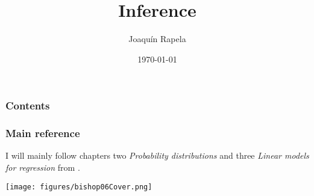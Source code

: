 \documentclass{beamer}
\title{Inference}
\author{Joaqu\'{i}n Rapela} %
\institute[GCNU, UCL] %
{
Gatsby Computational Neuroscience Unit\\University College London %
}
\date{\today} %
\begin{document}
\begin{frame}
\titlepage %
\end{frame}

\begin{frame}
\frametitle{Contents} %
\tableofcontents %
\end{frame}

\begin{frame}
\frametitle{Main reference} %

    I will mainly follow chapters two \textit{Probability distributions} and
    three \textit{Linear models for regression} from
    \citet{bishop06}.

    \begin{center}
        \texttt{[image: figures/bishop06Cover.png]}
    \end{center}

\end{frame}

\begin{comment}
\begin{frame}
\frametitle{Main lecture goals}

    \begin{figure}
        \begin{tikzpicture}
            \node[ellipse,align=center,anchor=north,fill=blue!20,draw=blue] (foundations) {Mathematical\\foundations\\of probability};
            \node[ellipse,align=center,anchor=north,fill=orange!20,draw=orange] [below left=of foundations] (proofs) {Proofs\\(beautiful)};
            \node[ellipse,align=center,anchor=north,fill=orange!20,draw=orange] [below=of foundations] (examples) {Examples\\(fun)};
            \node[ellipse,align=center,anchor=north,fill=orange!20,draw=orange] [below right=of foundations] (simulations) {Simulations\\(useful)};
            \path[-] (foundations) edge node [] {} (proofs);
            \path[-] (foundations) edge node [] {} (examples);
            \path[-] (foundations) edge node [] {} (simulations);
        \end{tikzpicture}
    \end{figure }

\end{frame}
\end{comment}
\end{document}
